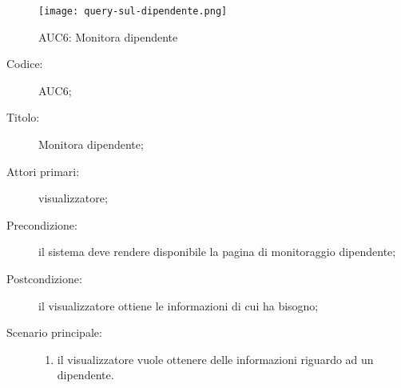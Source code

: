 \documentclass[../../../analisi-dei-requisiti.tex]{subfiles}
\begin{document}
\begin{figure}[H]
  \centering
  \texttt{[image: query-sul-dipendente.png]}
  \caption{AUC6: Monitora dipendente}%
  \label{fig:AUC6}
\end{figure}

\begin{description}
  \item[Codice:] AUC6;
  \item[Titolo:] Monitora dipendente;
  \item[Attori primari:] visualizzatore;
  \item[Precondizione:]  il sistema deve rendere disponibile la pagina di monitoraggio dipendente;
  \item[Postcondizione:] il visualizzatore ottiene le informazioni di cui ha bisogno;
  \item[Scenario principale:]
  \begin{enumerate}
    \item il visualizzatore vuole ottenere delle informazioni riguardo ad un dipendente.
  \end{enumerate}
\end{description}
\end{document}
